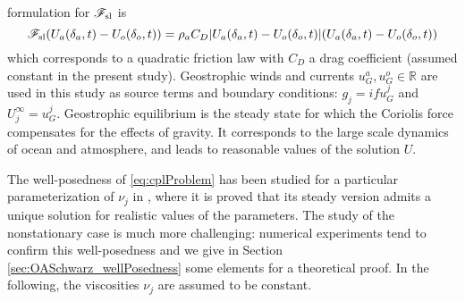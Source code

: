 formulation for ${\cal F}_{\rm sl}$ is
\[
{\cal F}_{\rm sl}( U_a(\delta_a,t)-U_o(\delta_o,t) ) = 
\rho_a C_D | U_a(\delta_a,t)-U_o(\delta_o,t) | (U_a(\delta_a,t)-U_o(\delta_o,t))
\]
which corresponds to a quadratic friction law with $C_D$ 
a drag coefficient (assumed constant in the present study).
%
%
Geostrophic winds and currents $u_G^a, u_G^o \in \mathbb{R}$
are used in this study as
source terms and boundary conditions: $g_j = if u_G^j$ and
$U_j^\infty = u_G^j$.
Geostrophic equilibrium is the steady state for which the 
Coriolis force compensates for the effects of gravity.
It corresponds to the large scale dynamics of ocean and 
atmosphere, and leads to reasonable values of the solution $U$. \par
The well-posedness of \eqref{eq:cplProblem} has been studied
for a particular parameterization of $\nu_j$ in 
\citep{thery_etude_2021},
where it is proved that its steady version admits a unique
solution for realistic values of the parameters. The study of the
nonstationary case is much more challenging: numerical experiments
tend to confirm this well-posedness and we give in Section
\ref{sec:OASchwarz_wellPosedness} some elements for a theoretical
proof. In the following, the viscosities $\nu_j$ are assumed to
be constant.
%
%
%
%
%
%
%
%
%
% 
%
%

